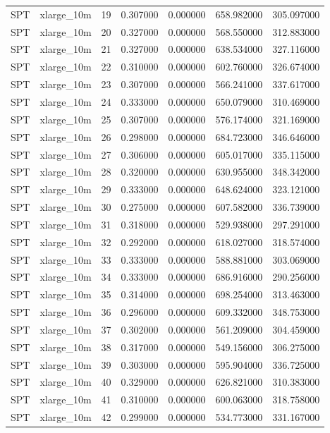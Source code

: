 \begin{tabular}{llrrrrr}
SPT & xlarge_10m & 19 & 0.307000 & 0.000000 & 658.982000 & 305.097000 \\
SPT & xlarge_10m & 20 & 0.327000 & 0.000000 & 568.550000 & 312.883000 \\
SPT & xlarge_10m & 21 & 0.327000 & 0.000000 & 638.534000 & 327.116000 \\
SPT & xlarge_10m & 22 & 0.310000 & 0.000000 & 602.760000 & 326.674000 \\
SPT & xlarge_10m & 23 & 0.307000 & 0.000000 & 566.241000 & 337.617000 \\
SPT & xlarge_10m & 24 & 0.333000 & 0.000000 & 650.079000 & 310.469000 \\
SPT & xlarge_10m & 25 & 0.307000 & 0.000000 & 576.174000 & 321.169000 \\
SPT & xlarge_10m & 26 & 0.298000 & 0.000000 & 684.723000 & 346.646000 \\
SPT & xlarge_10m & 27 & 0.306000 & 0.000000 & 605.017000 & 335.115000 \\
SPT & xlarge_10m & 28 & 0.320000 & 0.000000 & 630.955000 & 348.342000 \\
SPT & xlarge_10m & 29 & 0.333000 & 0.000000 & 648.624000 & 323.121000 \\
SPT & xlarge_10m & 30 & 0.275000 & 0.000000 & 607.582000 & 336.739000 \\
SPT & xlarge_10m & 31 & 0.318000 & 0.000000 & 529.938000 & 297.291000 \\
SPT & xlarge_10m & 32 & 0.292000 & 0.000000 & 618.027000 & 318.574000 \\
SPT & xlarge_10m & 33 & 0.333000 & 0.000000 & 588.881000 & 303.069000 \\
SPT & xlarge_10m & 34 & 0.333000 & 0.000000 & 686.916000 & 290.256000 \\
SPT & xlarge_10m & 35 & 0.314000 & 0.000000 & 698.254000 & 313.463000 \\
SPT & xlarge_10m & 36 & 0.296000 & 0.000000 & 609.332000 & 348.753000 \\
SPT & xlarge_10m & 37 & 0.302000 & 0.000000 & 561.209000 & 304.459000 \\
SPT & xlarge_10m & 38 & 0.317000 & 0.000000 & 549.156000 & 306.275000 \\
SPT & xlarge_10m & 39 & 0.303000 & 0.000000 & 595.904000 & 336.725000 \\
SPT & xlarge_10m & 40 & 0.329000 & 0.000000 & 626.821000 & 310.383000 \\
SPT & xlarge_10m & 41 & 0.310000 & 0.000000 & 600.063000 & 318.758000 \\
SPT & xlarge_10m & 42 & 0.299000 & 0.000000 & 534.773000 & 331.167000 \\

\end{tabular}
